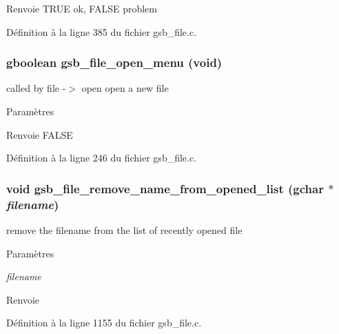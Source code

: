 \begin{DoxyReturn}{Renvoie}
TRUE ok, FALSE problem 
\end{DoxyReturn}


Définition à la ligne 385 du fichier gsb\_\-file.c.

\subsubsection[{gsb\_\-file\_\-open\_\-menu}]{\setlength{\rightskip}{0pt plus 5cm}gboolean gsb\_\-file\_\-open\_\-menu (void)}\label{gsb__file_8h_ae6bf4262fe73b7727f10eddb0c835b73}
called by file -\/$>$ open open a new file


\begin{DoxyParams}{Paramètres}
\item[{\em }]\end{DoxyParams}
\begin{DoxyReturn}{Renvoie}
FALSE 
\end{DoxyReturn}


Définition à la ligne 246 du fichier gsb\_\-file.c.

\subsubsection[{gsb\_\-file\_\-remove\_\-name\_\-from\_\-opened\_\-list}]{\setlength{\rightskip}{0pt plus 5cm}void gsb\_\-file\_\-remove\_\-name\_\-from\_\-opened\_\-list (gchar $\ast$ {\em filename})}\label{gsb__file_8h_a0ef446330135d6e1f04fea5e5f0cd190}
remove the filename from the list of recently opened file


\begin{DoxyParams}{Paramètres}
\item[{\em filename}]\end{DoxyParams}
\begin{DoxyReturn}{Renvoie}

\end{DoxyReturn}


Définition à la ligne 1155 du fichier gsb\_\-file.c.

